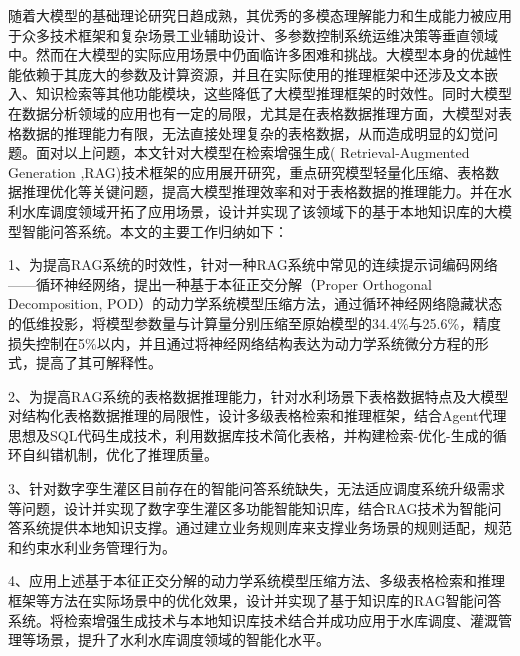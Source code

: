 \begin{cabstract}
    随着大模型的基础理论研究日趋成熟，其优秀的多模态理解能力和生成能力被应用于众多技术框架和复杂场景工业辅助设计、多参数控制系统运维决策等垂直领域中。然而在大模型的实际应用场景中仍面临许多困难和挑战。大模型本身的优越性能依赖于其庞大的参数及计算资源，并且在实际使用的推理框架中还涉及文本嵌入、知识检索等其他功能模块，这些降低了大模型推理框架的时效性。同时大模型在数据分析领域的应用也有一定的局限，尤其是在表格数据推理方面，大模型对表格数据的推理能力有限，无法直接处理复杂的表格数据，从而造成明显的幻觉问题。面对以上问题，本文针对大模型在检索增强生成( Retrieval-Augmented Generation ,RAG)技术框架的应用展开研究，重点研究模型轻量化压缩、表格数据推理优化等关键问题，提高大模型推理效率和对于表格数据的推理能力。并在水利水库调度领域开拓了应用场景，设计并实现了该领域下的基于本地知识库的大模型智能问答系统。本文的主要工作归纳如下： 

    1、为提高RAG系统的时效性，针对一种RAG系统中常见的连续提示词编码网络——循环神经网络，提出一种基于本征正交分解（Proper Orthogonal Decomposition, POD）的动力学系统模型压缩方法，通过循环神经网络隐藏状态的低维投影，将模型参数量与计算量分别压缩至原始模型的34.4\%与25.6\%，精度损失控制在5\%以内，并且通过将神经网络结构表达为动力学系统微分方程的形式，提高了其可解释性。
    
    2、为提高RAG系统的表格数据推理能力，针对水利场景下表格数据特点及大模型对结构化表格数据推理的局限性，设计多级表格检索和推理框架，结合Agent代理思想及SQL代码生成技术，利用数据库技术简化表格，并构建检索-优化-生成的循环自纠错机制，优化了推理质量。
    
    3、针对数字孪生灌区目前存在的智能问答系统缺失，无法适应调度系统升级需求等问题，设计并实现了数字孪生灌区多功能智能知识库，结合RAG技术为智能问答系统提供本地知识支撑。通过建立业务规则库来支撑业务场景的规则适配，规范和约束水利业务管理行为。

    4、应用上述基于本征正交分解的动力学系统模型压缩方法、多级表格检索和推理框架等方法在实际场景中的优化效果，设计并实现了基于知识库的RAG智能问答系统。将检索增强生成技术与本地知识库技术结合并成功应用于水库调度、灌溉管理等场景，提升了水利水库调度领域的智能化水平。
    \end{cabstract}
    
    
